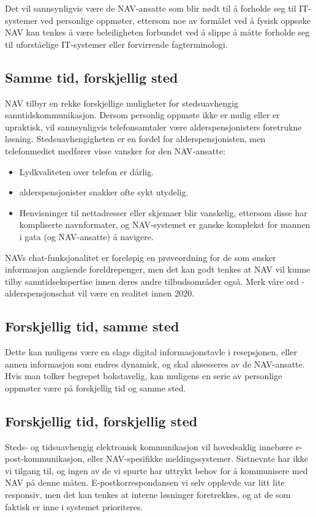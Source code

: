 \documentclass[informationsecurity]{gucmasterproject}
\begin{document}
Det vil sannsynligvis være de NAV-ansatte som blir nødt til å forholde seg til IT-systemer ved personlige oppmøter, ettersom noe av formålet ved å fysisk oppsøke NAV kan tenkes å være beleiligheten forbundet ved å slippe å måtte forholde seg til uforståelige IT-systemer eller forvirrende fagterminologi.

\subsection{Samme tid, forskjellig sted}
NAV tilbyr en rekke forskjellige muligheter for stedsuavhengig sanntidskommunikasjon. Dersom personlig oppmøte ikke er mulig eller er upraktisk, vil sannsynligvis telefonsamtaler være alderspensjonisters foretrukne løsning. Stedsuavhengigheten er en fordel for alderspensjonisten, men telefonmediet medfører visse vansker for den NAV-ansatte:
\begin{itemize}
\item Lydkvaliteten over telefon er dårlig.
\item alderspensjonister snakker ofte sykt utydelig.
\item Henvisninger til nettadresser eller skjemaer blir vanskelig, ettersom disse har kompliserte navnformater, og NAV-systemet er ganske komplekst for mannen i gata (og NAV-ansatte) å navigere.
\end{itemize}

NAVs chat-funksjonalitet er foreløpig en prøveordning for de som ønsker informasjon angående foreldrepenger, men det kan godt tenkes at NAV vil kunne tilby sanntidsekspertise innen deres andre tilbudsområder også. Merk våre ord - alderspensjonschat vil være en realitet innen 2020.

\subsection{Forskjellig tid, samme sted}
Dette kan muligens være en slags digital informasjonstavle i resepsjonen, eller annen informasjon som endres dynamisk, og skal aksesseres av de NAV-ansatte. Hvis man tolker begrepet bokstavelig, kan muligens en serie av personlige oppmøter være på forskjellig tid og samme sted.

\subsection{Forskjellig tid, forskjellig sted}
Steds- og tidsuavhengig elektronisk kommunikasjon vil hovedsaklig innebære e-post-kommunikasjon, eller NAV-spesifikke meldingssystemer. Sistnevnte har ikke vi tilgang til, og ingen av de vi spurte har uttrykt behov for å kommunisere med NAV på denne måten. E-postkorrespondansen vi selv opplevde var litt lite responsiv, men det kan tenkes at interne løsninger foretrekkes, og at de som faktisk er inne i systemet prioriteres.
\end{document}
